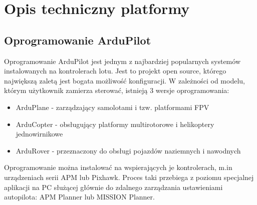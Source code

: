 \renewcommand{\thechapter}{\Alph{chapter}}
\chapter{Opis techniczny platformy}
\label{cha:opis_techniczny}

\section{Oprogramowanie ArduPilot}
Oprogramowanie ArduPilot jest jednym z najbardziej popularnych systemów instalowanych na kontrolerach lotu. Jest to projekt open source, którego największą zaletą jest bogata możliwość konfiguracji. W zależności od modelu, którym użytkownik zamierza sterować, istnieją 3 wersje oprogramowania: 
\begin{itemize}
	\item ArduPlane - zarządzający samolotami i tzw. platformami FPV
	\item ArduCopter - obsługujący platformy multirotorowe i helikoptery jednowirnikowe
	\item ArduRover - przeznaczony do obsługi pojazdów naziemnych i nawodnych
\end{itemize}
Oprogramowanie można instalować na wspierających je kontrolerach, m.in urządzeniach serii APM lub Pixhawk. Proces taki przebiega z poziomu specjalnej aplikacji na PC służącej głównie do zdalnego zarządzania ustawieniami autopilota: APM Planner lub MISSION Planner.

